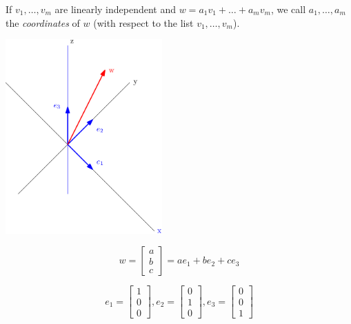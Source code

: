 \documentclass[11pt]{article}
\begin{document}
    If \(v_1, \dots, v_m\) are linearly independent and \(w = a_1 v_1 + \dots + a_m v_m\), we call \(a_1, \dots, a_m\) the \emph{coordinates} of $w$ (with respect to the list \(v_1, \dots, v_m\)).

    \begin{center}
        \includegraphics[width=6cm]{vector.png}
    \end{center}

    \begin{equation*}
        w = \begin{bmatrix}
                a \\
                b \\
                c
            \end{bmatrix} = a e_1 + b e_2 + c e_3
    \end{equation*}

    \begin{equation*}
        e_1 = \begin{bmatrix}
                1 \\ 0 \\ 0
            \end{bmatrix}, e_2 = \begin{bmatrix}
                                    0 \\ 1 \\ 0
                                \end{bmatrix}, e_3 = \begin{bmatrix}
                                                        0 \\ 0 \\ 1
                                                    \end{bmatrix}
    \end{equation*}
\end{document}
